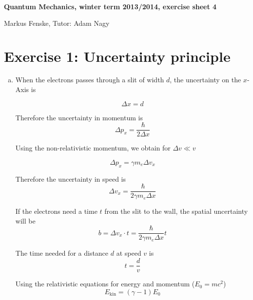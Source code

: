 \documentclass[a4paper,german,12pt,smallheadings]{scrartcl}
\begin{document}
\begin{center}
\bfseries %
\sffamily %
\vspace{-40pt}
Quantum Mechanics, winter term 2013/2014, exercise sheet 4

Markus Fenske, Tutor: Adam Nagy
\vspace{-10pt}
\end{center}

\section*{Exercise 1: Uncertainty principle}
\begin{enumerate}[a)]
  \item
    When the electrons passes through a slit of width $d$, the uncertainty on the $x$-Axis is

    \begin{equation*}
      \Delta x = d
    \end{equation*}

    Therefore the uncertainty in momentum is
    \begin{equation*}
      \Delta p_x = \frac{\hbar}{2 \Delta x}
    \end{equation*}

    Using the non-relativistic momentum, we obtain for $\Delta v \ll v$

    \begin{equation*}
      \Delta p_x = \gamma m_e \Delta v_x
    \end{equation*}

    Therefore the uncertainty in speed is
    \begin{equation*}
      \Delta v_x = \frac{\hbar}{2 \gamma m_e \Delta x}
    \end{equation*}

    If the electrons need a time $t$ from the slit to the wall, the spatial uncertainty will be
    \begin{equation*}
      b = \Delta v_x \cdot t = \frac{\hbar}{2 \gamma m_e \Delta x} t
    \end{equation*}

    The time needed for a distance $d$ at speed $v$ is
    \begin{equation*}
      t = \frac{d}{v}
    \end{equation*}

    Using the relativistic equations for energy and momentum ($E_0 = mc^2$)
    \begin{equation*}
      E_\text{kin} = (\gamma - 1) E_0
    \end{equation*}


\end{enumerate}
\end{document}
